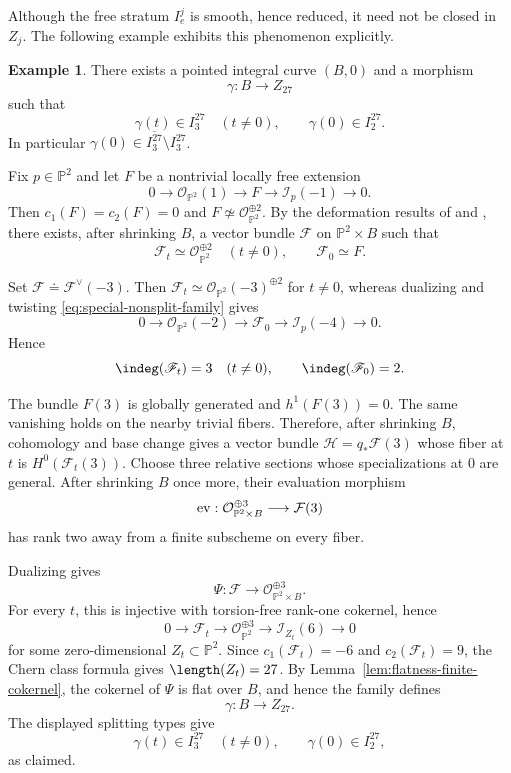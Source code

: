 \documentclass[11pt]{amsart} %
\theoremstyle{definition}
\newtheorem{Example}[Theorem]{Example}
\def\ev{{\rm ev}}
\def\NZQ{\mathbb}               %
\def\PP{{\NZQ P}}
\begin{document}
Although the free stratum $I_e^j$ is smooth, hence reduced, it need not be closed in $Z_j$. The following example exhibits this phenomenon explicitly.

\begin{Example}\label{ex:1-par-family-free-degeneration}
There exists a pointed integral curve $(B,0)$ and a morphism
\[
\gamma:B\longrightarrow Z_{27}
\]
such that
\[
\gamma(t)\in I_3^{27}
\quad(t\neq0),
\qquad
\gamma(0)\in I_2^{27}.
\]
In particular \(\gamma(0)\in
\overline{I_3^{27}}\setminus I_3^{27}\).

Fix $p\in\PP^2$ and let $F$ be a nontrivial locally free extension
\begin{equation}\label{eq:special-nonsplit-family}
0
\longrightarrow
\mathcal O_{\PP^2}(1)
\longrightarrow
F
\longrightarrow
\mathcal I_p(-1)
\longrightarrow0.
\end{equation}
Then \(c_1(F)=c_2(F)=0\) and \(F\not\simeq\mathcal O_{\PP^2}^{\oplus2}\). By the deformation results of
\cite[Remark~4.6]{Stromme1983} and
\cite[Proposition~4]{Beauville2018}, there exists, after shrinking
$B$, a vector bundle $\mathcal F$ on $\PP^2\times B$ such that
\[
\mathcal F_t\simeq\mathcal O_{\PP^2}^{\oplus2}
\quad(t\neq0),
\qquad
\mathcal F_0\simeq F.
\]

Set \(\mathscr F
\doteq
\mathcal F^\vee(-3)\). Then \(\mathscr F_t
\simeq
\mathcal O_{\PP^2}(-3)^{\oplus2}\) for \(t\neq0\), whereas dualizing and twisting
\eqref{eq:special-nonsplit-family} gives
\[
0
\longrightarrow
\mathcal O_{\PP^2}(-2)
\longrightarrow
\mathscr F_0
\longrightarrow
\mathcal I_p(-4)
\longrightarrow0.
\]
Hence
\[
\indeg(\mathscr F_t)=3
\quad(t\neq0),
\qquad
\indeg(\mathscr F_0)=2.
\]

The bundle $F(3)$ is globally generated and \(h^1(F(3))=0\). The same vanishing holds on the nearby trivial fibers. Therefore,
after shrinking $B$, cohomology and base change gives a vector bundle \(\mathcal H=q_*\mathcal F(3)\) whose fiber at $t$ is $H^0(\mathcal F_t(3))$. Choose three relative
sections whose specializations at $0$ are general. After shrinking
$B$ once more, their evaluation morphism
\[
\ev:
\mathcal O_{\PP^2\times B}^{\oplus3}
\longrightarrow
\mathcal F(3)
\]
has rank two away from a finite subscheme on every fiber.

Dualizing gives
\[
\Psi:
\mathscr F
\longrightarrow
\mathcal O_{\PP^2\times B}^{\oplus3}.
\]
For every $t$, this is injective with torsion-free rank-one cokernel,
hence
\[
0
\longrightarrow
\mathscr F_t
\longrightarrow
\mathcal O_{\PP^2}^{\oplus3}
\longrightarrow
\mathcal I_{Z_t}(6)
\longrightarrow0
\]
for some zero-dimensional $Z_t\subset\PP^2$. Since \(c_1(\mathscr F_t)=-6\) and \(
c_2(\mathscr F_t)=9\), the Chern class formula gives \(\length(Z_t)=27\). By Lemma~\ref{lem:flatness-finite-cokernel}, the cokernel of $\Psi$
is flat over $B$, and hence the family defines
\[
\gamma:B\longrightarrow Z_{27}.
\]
The displayed splitting types give
\[
\gamma(t)\in I_3^{27}
\quad(t\neq0),
\qquad
\gamma(0)\in I_2^{27},
\]
as claimed.
\end{Example}
\end{document}
